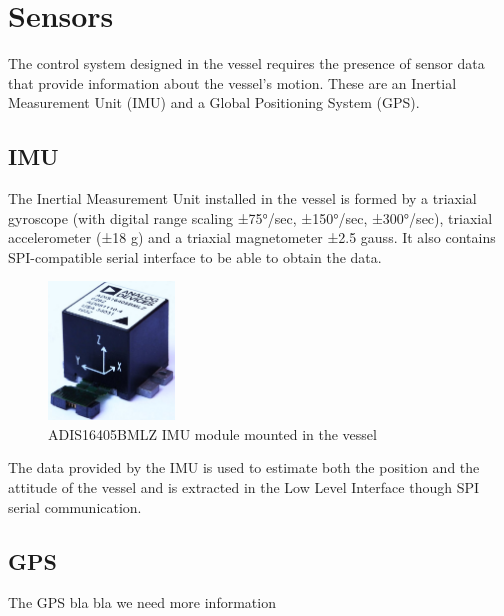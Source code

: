 \section{Sensors}

The control system designed in the vessel requires the presence of sensor data that provide information about the vessel's motion. These are an Inertial Measurement Unit (IMU) and a Global Positioning System (GPS).

\subsection{IMU}

The Inertial Measurement Unit installed in the vessel is formed by a triaxial gyroscope (with digital range scaling
±75°/sec, ±150°/sec, ±300°/sec), triaxial accelerometer (±18 g) and a triaxial magnetometer ±\num{2.5} gauss. It also contains SPI-compatible serial interface to be able to obtain the data. \cite{IMUDatasheet}
%
\begin{figure}[H]
	\includegraphics[width=0.3\textwidth]{figures/IMU}
	\caption{ADIS16405BMLZ IMU module mounted in the vessel \cite{IMUFigure}}
	\label{fig:IMU}
\end{figure}
%
The data provided by the IMU is used to estimate both the position and the attitude of the vessel and is extracted in the Low Level Interface though SPI serial communication.


\subsection{GPS}
\cite{GPS}
The GPS bla bla we need more information


